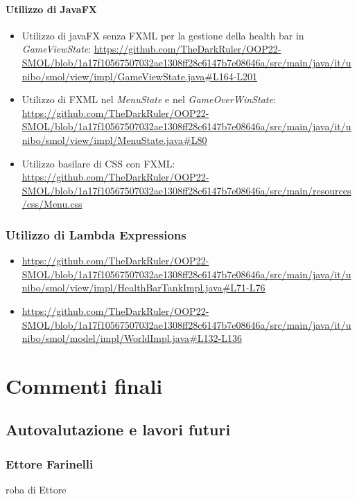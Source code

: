 \documentclass[a4paper,12pt]{report}
\begin{document}
\subsubsection*{Utilizzo di JavaFX}
\begin{itemize}
    \item Utilizzo di javaFX senza FXML per la gestione della health bar in \emph{GameViewState}: \url{https://github.com/TheDarkRuler/OOP22-SMOL/blob/1a17f10567507032ae1308ff28c6147b7e08646a/src/main/java/it/unibo/smol/view/impl/GameViewState.java#L164-L201}
    \item Utilizzo di FXML nel \emph{MenuState} e nel \emph{GameOverWinState}: \url{https://github.com/TheDarkRuler/OOP22-SMOL/blob/1a17f10567507032ae1308ff28c6147b7e08646a/src/main/java/it/unibo/smol/view/impl/MenuState.java#L80}
    \item Utilizzo basilare di CSS con FXML: \url{https://github.com/TheDarkRuler/OOP22-SMOL/blob/1a17f10567507032ae1308ff28c6147b7e08646a/src/main/resources/css/Menu.css}
\end{itemize}

\subsection*{Utilizzo di Lambda Expressions}
\begin{itemize}
    \item \url{https://github.com/TheDarkRuler/OOP22-SMOL/blob/1a17f10567507032ae1308ff28c6147b7e08646a/src/main/java/it/unibo/smol/view/impl/HealthBarTankImpl.java#L71-L76}
    \item \url{https://github.com/TheDarkRuler/OOP22-SMOL/blob/1a17f10567507032ae1308ff28c6147b7e08646a/src/main/java/it/unibo/smol/model/impl/WorldImpl.java#L132-L136}
\end{itemize}

\chapter{Commenti finali}

\section{Autovalutazione e lavori futuri}
\subsection*{Ettore Farinelli}
roba di Ettore
\end{document}
